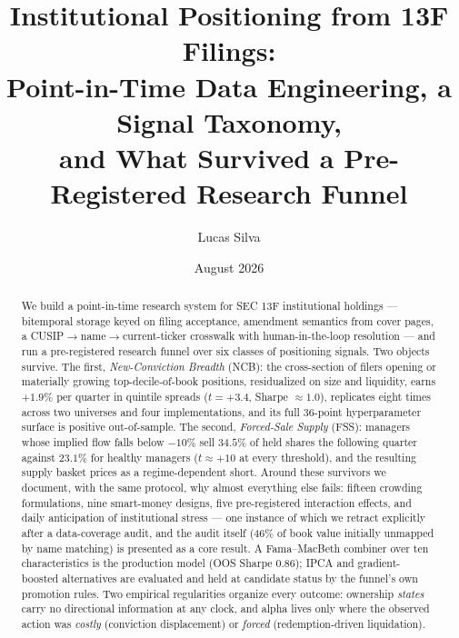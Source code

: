 \documentclass[11pt]{article}
\title{Institutional Positioning from 13F Filings:\\
Point-in-Time Data Engineering, a Signal Taxonomy,\\
and What Survived a Pre-Registered Research Funnel}
\author{Lucas Silva}
\date{August 2026}
\begin{document}
\maketitle

\begin{abstract}
\noindent We build a point-in-time research system for SEC 13F
institutional holdings --- bitemporal storage keyed on filing
acceptance, amendment semantics from cover pages, a
CUSIP$\to$name$\to$current-ticker crosswalk with human-in-the-loop
resolution --- and run a pre-registered research funnel over six
classes of positioning signals. Two objects survive. The first,
\emph{New-Conviction Breadth} (NCB): the cross-section of filers
opening or materially growing top-decile-of-book positions,
residualized on size and liquidity, earns $+1.9\%$ per quarter in
quintile spreads ($t=+3.4$, Sharpe $\approx 1.0$), replicates eight
times across two universes and four implementations, and its full
$36$-point hyperparameter surface is positive out-of-sample. The
second, \emph{Forced-Sale Supply} (FSS): managers whose implied flow
falls below $-10\%$ sell $34.5\%$ of held shares the following quarter
against $23.1\%$ for healthy managers ($t\approx+10$ at every
threshold), and the resulting supply basket prices as a
regime-dependent short. Around these survivors we document, with the
same protocol, why almost everything else fails: fifteen crowding
formulations, nine smart-money designs, five pre-registered
interaction effects, and daily anticipation of institutional stress
--- one instance of which we retract explicitly after a data-coverage
audit, and the audit itself (46\% of book value initially unmapped by
name matching) is presented as a core result. A Fama--MacBeth
combiner over ten characteristics is the production model (OOS Sharpe
$0.86$); IPCA and gradient-boosted alternatives are evaluated and
held at candidate status by the funnel's own promotion rules. Two
empirical regularities organize every outcome: ownership
\emph{states} carry no directional information at any clock, and
alpha lives only where the observed action was \emph{costly}
(conviction displacement) or \emph{forced} (redemption-driven
liquidation).
\end{abstract}

\tableofcontents
\newpage


















\appendix



\end{document}
